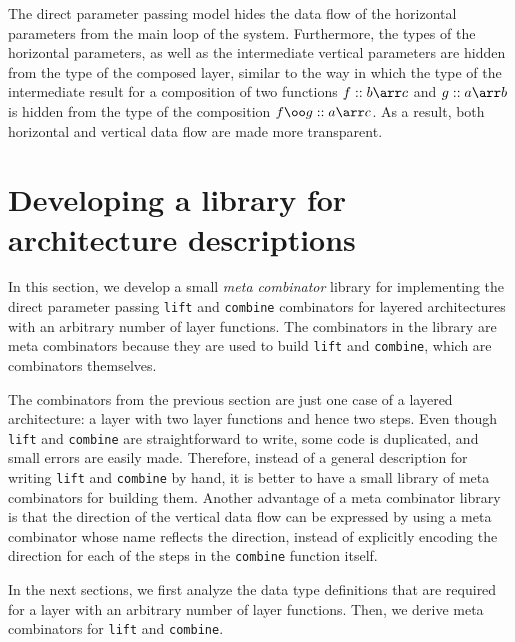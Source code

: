 The direct parameter passing model hides the data flow of the horizontal parameters from the main loop of the system. Furthermore, the types of the horizontal parameters, as well as the intermediate vertical parameters are hidden from the type of the composed layer, similar to the way in which the type of the intermediate result for a composition of two functions $f :: b \arr c$ and $g :: a \arr b$ is hidden from the type of the composition $f \oo g :: a \arr c$. As a result, both horizontal and vertical data flow are made more transparent.   


%																
%																
%																
\section{Developing a library for architecture descriptions} \label{sectlib}

In this section, we develop a small {\em meta combinator} library for implementing the direct parameter passing \texttt{lift} and \texttt{combine} combinators for layered architectures with an arbitrary number of layer functions. The combinators in the library are meta combinators because they are used to build \texttt{lift} and \texttt{combine}, which are combinators themselves.

The combinators from the previous section are just one case of a layered architecture: a layer with two layer functions and hence two steps. Even though \texttt{lift} and \texttt{combine} are straightforward to write, some code is duplicated, and small errors are easily made. Therefore, instead of a general description for writing \texttt{lift} and \texttt{combine} by hand, it is better to have a small library of meta combinators for building them. Another advantage of a meta combinator library is that the direction of the vertical data flow can be expressed by using a meta combinator whose name reflects the direction, instead of explicitly encoding the direction for each of the steps in the \texttt{combine} function itself.

In the next sections, we first analyze the data type definitions that are required for a layer with an arbitrary number of layer functions. Then, we derive meta combinators for \texttt{lift} and \texttt{combine}. 

